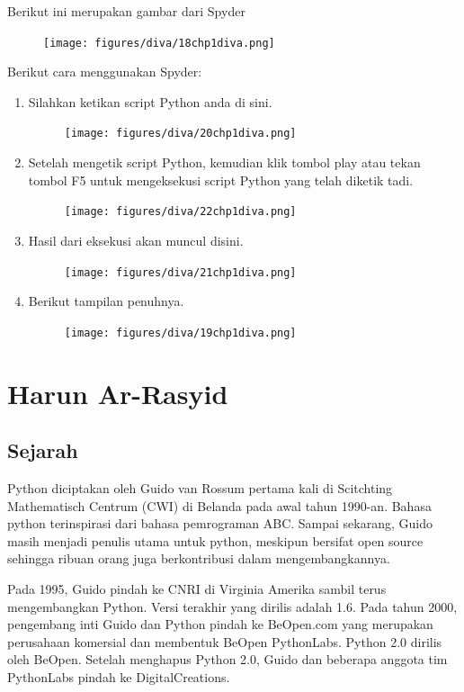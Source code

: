 Berikut ini merupakan gambar dari Spyder
\begin{figure}[H]
	\texttt{[image: figures/diva/18chp1diva.png]}
	\centering
\end{figure}

Berikut cara menggunakan Spyder:
\begin{enumerate}
	\item Silahkan ketikan script Python anda di sini.
	\begin{figure}[H]
		\texttt{[image: figures/diva/20chp1diva.png]}
		\centering
	\end{figure}
	\item Setelah mengetik script Python, kemudian klik tombol play atau tekan tombol F5 untuk mengeksekusi script Python yang telah diketik tadi.
	\begin{figure}[H]
		\texttt{[image: figures/diva/22chp1diva.png]}
		\centering
	\end{figure}
	\item Hasil dari eksekusi akan muncul disini.
	\begin{figure}[H]
		\texttt{[image: figures/diva/21chp1diva.png]}
		\centering
	\end{figure}
		\item Berikut tampilan penuhnya.
	\begin{figure}[H]
		\texttt{[image: figures/diva/19chp1diva.png]}
		\centering
	\end{figure}
\end{enumerate}


\section{Harun Ar-Rasyid}
\subsection{Sejarah}
Python diciptakan oleh Guido van Rossum pertama kali di Scitchting Mathematisch Centrum (CWI) di Belanda pada awal tahun 1990-an. Bahasa python terinspirasi dari bahasa pemrograman ABC. Sampai sekarang, Guido masih menjadi penulis utama untuk python, meskipun bersifat open source sehingga ribuan orang juga berkontribusi dalam mengembangkannya.

Pada 1995, Guido pindah ke CNRI di Virginia Amerika sambil terus mengembangkan Python. Versi terakhir yang dirilis adalah 1.6. Pada tahun 2000, pengembang inti Guido dan Python pindah ke BeOpen.com yang merupakan perusahaan komersial dan membentuk BeOpen PythonLabs. Python 2.0 dirilis oleh BeOpen. Setelah menghapus Python 2.0, Guido dan beberapa anggota tim PythonLabs pindah ke DigitalCreations.


